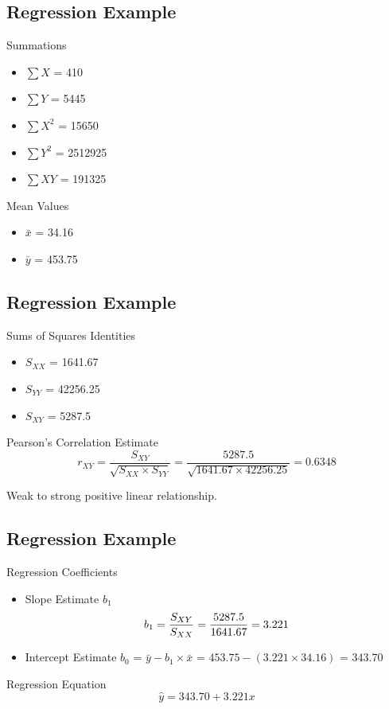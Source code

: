 \documentclass[]{report}
\begin{document}
	\subsection{Regression Example}
	Summations
\begin{multicols}{3}
	\begin{itemize}
		\item $\sum X$ = 410
		\item $\sum Y$ = 5445
		\item $\sum X^2$ = 15650
		\item $\sum Y^2$ = 2512925
		\item $\sum XY$ = 191325
	\end{itemize}
\end{multicols}
	Mean Values
	\begin{itemize}
		\item $\bar{x}$ = 34.16
		\item $\bar{y}$ = 453.75
	\end{itemize}
	
	
	
	\subsection{Regression Example}
	Sums of Squares Identities
	\begin{itemize}
		\item $S_{XX}$ = 1641.67
		\item $S_{YY}$ = 42256.25
		\item $S_{XY}$ = 5287.5
	\end{itemize}
	Pearson's Correlation Estimate
	\[ r_{XY} = \frac{S_{XY}}{\sqrt{S_{XX} \times S_{YY}}} = \frac{5287.5}{\sqrt{1641.67 \times 42256.25}} = 0.6348 \]
	
	Weak to strong positive linear relationship.
	
	
	\subsection{Regression Example}
	Regression Coefficients
	\begin{itemize}
		\item Slope Estimate $b_1$
		\[b_1 = \frac{S_{XY}}{S_{XX}} = {5287.5 \over 1641.67} = 3.221\]
		\item Intercept Estimate $b_0$ = $\bar{y} - b_1 \times \bar{x}$ = $453.75-(3.221\times 34.16)$ = 343.70
	\end{itemize}
	Regression Equation
	\[ \hat{y} = 343.70 + 3.221x \]
	
\end{document}
